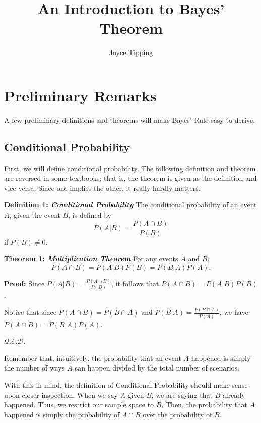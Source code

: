 \documentclass{article}
\newenvironment{proof} {\textbf{Proof:} \newline} {\hfill
  $\mathcal{Q.E.D.}$}
\newenvironment{thm}[2][]{\vspace{0.2cm} \textbf{Theorem #2:
    \textit{#1}} \newline}{}
\newenvironment{defn}[2][]{\vspace{0.2cm} \textbf{Definition #2:
    \textit{#1}} \newline}{}
\begin{document}
\title{An Introduction to Bayes' Theorem}
\author{Joyce Tipping}
\date{}
\maketitle

\setlength{\parindent}{0cm}
\setlength{\parskip}{0.3cm}

\section{Preliminary Remarks}

A few preliminary definitions and theorems will make Bayes'
Rule easy to derive.

\subsection{Conditional Probability}

First, we will define conditional probability. The following
definition and theorem are reversed in some textbooks; that
is, the theorem is given as the definition and vice
versa. Since one implies the other, it really hardly
matters.

\begin{defn}[Conditional Probability]{1}
  The conditional probability of an event $A$, given the event
  $B$, is defined by $$P(A|B) = \frac{P(A \cap B)}{P(B)}$$ if
  $P(B) \neq 0$.
\end{defn}


\begin{thm}[Multiplication Theorem]{1}
  For any events $A$ and $B$, $$P(A \cap B) = P(A|B)P(B) =
  P(B|A)P(A).$$
\end{thm}

\begin{proof}
    Since $P(A|B) = \frac{P(A \cap B)}{P(B)}$, it follows
    that $P(A \cap B) = P(A|B)P(B)$.

    Notice that since $P(A \cap B) = P(B \cap A)$ and
    $P(B|A) = \frac{P(B \cap A)}{P(A)}$, we have $P(A \cap
    B) = P(B|A)P(A)$.

\end{proof}

Remember that, intuitively, the probability that an event
$A$ happened is simply the number of ways $A$ can happen
divided by the total number of scenarios.

With this in mind, the definition of Conditional Probability
should make sense upon closer inspection. When we say $A$
given $B$, we are saying that $B$ already happened. Thus, we
restrict our sample space to $B$. Then, the probability that
$A$ happened is simply the probability of $A \cap B$ over
the probability of $B$.
\end{document}
